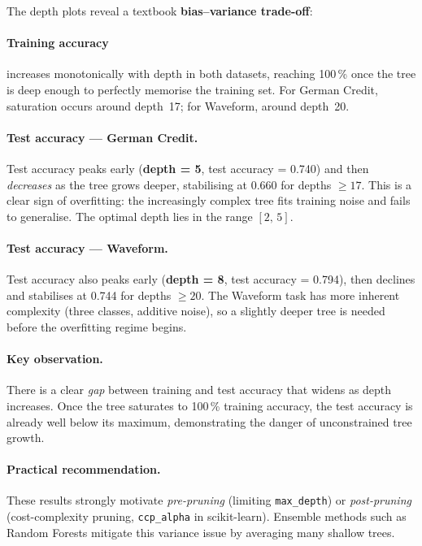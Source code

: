 \documentclass[12pt,a4paper]{article}
\begin{document}
The depth plots reveal a textbook \textbf{bias--variance trade-off}:

\paragraph{Training accuracy} increases monotonically with depth in both
datasets, reaching 100\,\% once the tree is deep enough to perfectly
memorise the training set. For German Credit, saturation occurs around
depth~17; for Waveform, around depth~20.

\paragraph{Test accuracy --- German Credit.}
Test accuracy peaks early (\textbf{depth = 5}, test accuracy = 0.740)
and then \emph{decreases} as the tree grows deeper, stabilising at
0.660 for depths $\geq 17$. This is a clear sign of overfitting: the
increasingly complex tree fits training noise and fails to generalise.
The optimal depth lies in the range $[2,\,5]$.

\paragraph{Test accuracy --- Waveform.}
Test accuracy also peaks early (\textbf{depth = 8}, test accuracy = 0.794),
then declines and stabilises at 0.744 for depths $\geq 20$. The Waveform
task has more inherent complexity (three classes, additive noise), so a
slightly deeper tree is needed before the overfitting regime begins.

\paragraph{Key observation.}
There is a clear \emph{gap} between training and test accuracy that widens
as depth increases. Once the tree saturates to 100\,\% training accuracy,
the test accuracy is already well below its maximum, demonstrating the
danger of unconstrained tree growth.

\paragraph{Practical recommendation.}
These results strongly motivate \emph{pre-pruning} (limiting
\texttt{max\_depth}) or \emph{post-pruning} (cost-complexity pruning,
\texttt{ccp\_alpha} in scikit-learn). Ensemble methods such as Random
Forests mitigate this variance issue by averaging many shallow trees.
\end{document}
